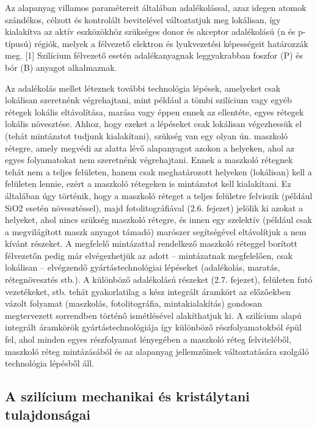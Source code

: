 \documentclass{article}
\begin{document}
Az alapanyag villamos paramétereit általában adalékolással, azaz idegen atomok
szándékos, célzott és kontrolált bevitelével változtatjuk meg lokálisan, így kialakítva az aktív
eszközökhöz szükséges donor és akceptor adalékolású (n és p-típusú) régiók, melyek a
félvezető elektron és lyukvezetési képességeit határozzák meg. [1] Szilícium félvezető
esetén adalékanyagnak leggyakrabban foszfor (P) és bór (B) anyagot alkalmaznak. 

Az adalékolás mellet léteznek további technológia lépések, amelyeket csak lokálisan
szeretnénk végrehajtani, mint például a tömbi szilícium vagy egyéb rétegek lokális
eltávolítása, marása vagy éppen ennek az ellentéte, egyes rétegek lokális növesztése.
Ahhoz, hogy ezeket a lépéseket csak lokálisan végezhessük el (tehát mintázatot tudjunk
kialakítani), szükség van egy olyan ún. maszkoló rétegre, amely megvédi az alatta lévő alapanyagot azokon a helyeken, ahol az egyes folyamatokat nem szeretnénk végrehajtani.
Ennek a maszkoló rétegnek tehát nem a teljes felületen, hanem csak meghatározott
helyeken (lokálisan) kell a felületen lennie, ezért a maszkoló rétegeken is mintázatot kell
kialakítani. Ez általában úgy történik, hogy a maszkoló réteget a teljes felületre felviszik
(például SiO2 esetén növesztéssel), majd fotolitográfiával (2.6. fejezet) jelölik ki azokat a
helyeket, ahol nincs szükség maszkoló rétegre, és innen egy szelektív (például csak a
megvilágított maszk anyagot támadó) marószer segítségével eltávolítjuk a nem kívánt
részeket. A megfelelő mintázattal rendelkező maszkoló réteggel borított félvezetőn pedig
már elvégezhetjük az adott – mintázatnak megfelelően, csak lokálisan – elvégzendő
gyártástechnológiai lépéseket (adalékolás, maratás, rétegnövesztés stb.). A különböző
adalékolású részeket (2.7. fejezet), felületen futó vezetékeket, stb. tehát gyakorlatilag a kész
integrált áramkört az előzőekben vázolt folyamat (maszkolás, fotolitográfia, mintakialakítás)
gondosan megtervezett sorrendben történő ismétlésével alakíthatjuk ki. A szilícium alapú
integrált áramkörök gyártástechnológiája így különböző részfolyamatokból épül fel, ahol
minden egyes részfolyamat lényegében a maszkoló réteg felviteléből, maszkoló réteg
mintázásából és az alapanyag jellemzőinek változtatására szolgáló technológia lépésből áll. 

\subsection{A szilícium mechanikai és kristálytani tulajdonságai}
\end{document}
